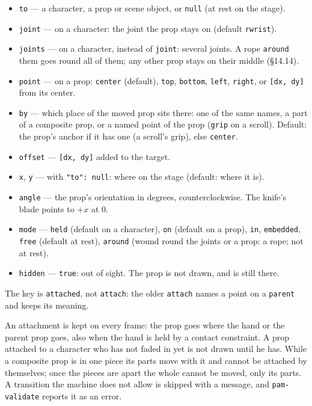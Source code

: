 \documentclass[
  12pt,
  letterpaper,
]{book}
\providecommand{\tightlist}{%
  \setlength{\itemsep}{0pt}\setlength{\parskip}{0pt}}
\begin{document}
\begin{itemize}
\tightlist
\item
  \texttt{to} --- a character, a prop or scene object, or
  \texttt{null} (at rest on the stage).
\item
  \texttt{joint} --- on a character: the joint the prop stays on
  (default \texttt{rwrist}).
\item
  \texttt{joints} --- on a character, instead of \texttt{joint}:
  several joints. A rope \texttt{around} them goes round all of them;
  any other prop stays on their middle (\S14.14).
\item
  \texttt{point} --- on a prop: \texttt{center} (default),
  \texttt{top}, \texttt{bottom}, \texttt{left}, \texttt{right}, or
  \texttt{{[}dx,\ dy{]}} from its center.
\item
  \texttt{by} --- which place of the moved prop sits there: one of the
  same names, a part of a composite prop, or a named point of the prop
  (\texttt{grip} on a scroll). Default: the prop's anchor if it has
  one (a scroll's grip), else \texttt{center}.
\item
  \texttt{offset} --- \texttt{{[}dx,\ dy{]}} added to the target.
\item
  \texttt{x}, \texttt{y} --- with \texttt{"to": null}: where on the
  stage (default: where it is).
\item
  \texttt{angle} --- the prop's orientation in degrees,
  counterclockwise. The knife's blade points to $+x$ at 0.
\item
  \texttt{mode} --- \texttt{held} (default on a character),
  \texttt{on} (default on a prop), \texttt{in}, \texttt{embedded},
  \texttt{free} (default at rest), \texttt{around} (wound round the
  joints or a prop: a rope; not at rest).
\item
  \texttt{hidden} --- \texttt{true}: out of sight. The prop is not
  drawn, and is still there.
\end{itemize}

The key is \texttt{attached}, not \texttt{attach}: the older
\texttt{attach} names a point on a \texttt{parent} and keeps its
meaning.

An attachment is kept on every frame: the prop goes where the hand or
the parent prop goes, also when the hand is held by a contact
constraint. A prop attached to a character who has not faded in yet is
not drawn until he has. While a composite prop is in one piece its
parts move with it and cannot be attached by themselves; once the
pieces are apart the whole cannot be moved, only its parts. A
transition the machine does not allow is skipped with a message, and
\texttt{pam-validate} reports it as an error.
\end{document}
